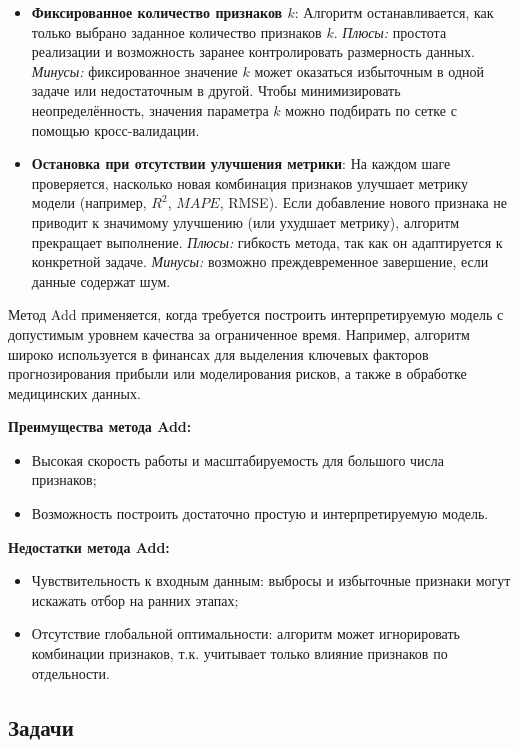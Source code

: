 \begin{itemize}
    \item \textbf{Фиксированное количество признаков $k$}:  
    Алгоритм останавливается, как только выбрано заданное количество признаков $k$.  
    \textit{Плюсы:} простота реализации и возможность заранее контролировать размерность данных.  
    \textit{Минусы:} фиксированное значение $k$ может оказаться избыточным в одной задаче или недостаточным в другой. Чтобы минимизировать неопределённость, значения параметра $k$ можно подбирать по сетке с помощью кросс-валидации.
    
    \item \textbf{Остановка при отсутствии улучшения метрики}:  
    На каждом шаге проверяется, насколько новая комбинация признаков улучшает метрику модели (например, \(R^2\), \(MAPE\), RMSE). Если добавление нового признака не приводит к значимому улучшению (или ухудшает метрику), алгоритм прекращает выполнение.  
    \textit{Плюсы:} гибкость метода, так как он адаптируется к конкретной задаче.  
    \textit{Минусы:} возможно преждевременное завершение, если данные содержат шум.
\end{itemize}

Метод Add применяется, когда требуется построить интерпретируемую модель с допустимым уровнем качества за ограниченное время. Например, алгоритм широко используется в финансах для выделения ключевых факторов прогнозирования прибыли или моделирования рисков, а также в обработке медицинских данных. 

\textbf{Преимущества метода Add:}
\begin{itemize}
    \item Высокая скорость работы и масштабируемость для большого числа признаков;
    \item Возможность построить достаточно простую и интерпретируемую модель.
\end{itemize}

\textbf{Недостатки метода Add:}
\begin{itemize}
    \item Чувствительность к входным данным: выбросы и избыточные признаки могут искажать отбор на ранних этапах;
    \item Отсутствие глобальной оптимальности: алгоритм может игнорировать комбинации признаков, т.к. учитывает только влияние признаков по отдельности.
\end{itemize}

\subsection{Задачи}

